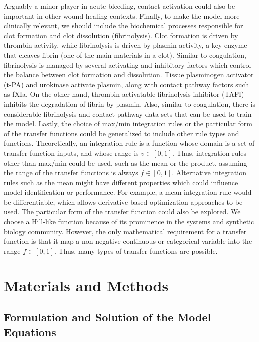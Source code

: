 \documentclass[processes,article,received,moreauthors,pdftex,12pt,a4paper]{mdpi}
\begin{document}
Arguably a minor player in acute bleeding, contact activation could also be important in other wound healing contexts. 
Finally, to make the model more clinically relevant, we should include the biochemical processes responsible for clot formation and clot dissolution (fibrinolysis).
Clot formation is driven by thrombin activity, while fibrinolysis is driven by plasmin activity, a key enzyme that cleaves fibrin (one of the main materials in a clot).
Similar to coagulation, fibrinolysis is managed by several activating and inhibitory factors which control the balance between clot formation and dissolution.
Tissue plasminogen activator (t-PA) and urokinase activate plasmin, along with contact pathway factors such as fXIa. On the other hand, thrombin activatable fibrinolysis inhibitor (TAFI)
inhibits the degradation of fibrin by plasmin. Also, similar to coagulation, there is considerable fibrinolysis and contact pathway data sets that can be used to train the model.
Lastly, the choice of max/min integration rules or the particular form of the transfer functions could be generalized to include other rule types and functions. 
Theoretically, an integration rule is a function whose domain is a set of transfer function inputs, and whose range is $v\in[0,1]$.
Thus, integration rules other than max/min could be used, such as the mean or the product, assuming the range of the transfer functions is always $f\in[0,1]$.
Alternative integration rules such as the mean might have different properties which could influence model identification or performance. 
For example, a mean integration rule would be differentiable, which allows derivative-based optimization approaches to be used. 
The particular form of the transfer function could also be explored. We choose a Hill-like function because of its 
prominence in the systems and synthetic biology community. 
However, the only mathematical requirement for a transfer function is that it map a non-negative continuous or categorical variable into the 
range $f\in[0,1]$. Thus, many types of transfer functions are possible.



\section{Materials and Methods}
\vspace{-12pt}

\subsection{Formulation and Solution of the Model Equations
}
\end{document}

